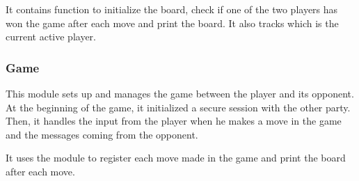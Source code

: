 It contains function to initialize the board, check if one of the two players
has won the game after each move and print the board. It also tracks which is
the current active player.

\subsubsection{Game}

This module sets up and manages the game between the player and its opponent. At
the beginning of the game, it initialized a secure session with the other party.
Then, it handles the input from the player when he makes a move in the game and
the messages coming from the opponent.

It uses the  module to register each move made in the game and
print the board after each move.
